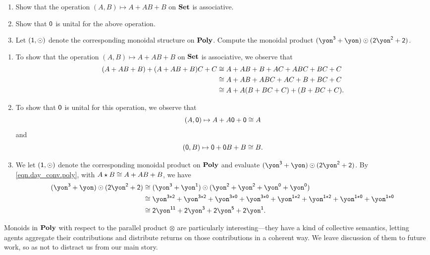 \documentclass[Book-Poly]{subfiles}
\begin{document}
\begin{exercise}
\begin{enumerate}
	\item Show that the operation $(A, B)\mapsto A+AB+B$ on $\mathbf{Set}$ is associative.
	\item Show that $\textsf{0}$ is unital for the above operation.
	\item Let $(\textsf{1},\odot)$ denote the corresponding monoidal structure on $\mathbf{Poly}$. Compute the monoidal product $(\yon^\3+\yon)\odot(\2\yon^\2+\2)$.
\qedhere
\end{enumerate}
\begin{solution}
\begin{enumerate}
    \item To show that the operation $(A, B)\mapsto A+AB+B$ on $\mathbf{Set}$ is associative, we observe that
    \begin{align*}
        (A + AB + B) + (A + AB + B)C + C &\cong A + AB + B + AC + ABC + BC + C \\
        &\cong A + AB + ABC + AC + B + BC + C \\
        &\cong A + A(B + BC + C) + (B + BC + C).
    \end{align*}
    \item To show that $\textsf{0}$ is unital for this operation, we observe that
    \[
        (A, \textsf{0}) \mapsto A + A\textsf{0} + \textsf{0} \cong A
    \]
    and
    \[
        (\textsf{0}, B) \mapsto \textsf{0} + \textsf{0}B + B \cong B.
    \]
    \item We let $(\textsf{1},\odot)$ denote the corresponding monoidal product on $\mathbf{Poly}$ and evaluate $(\yon^\3+\yon)\odot(\2\yon^\2+\2)$.
    By \eqref{eqn.day_conv.poly}, with $A \star B \cong A + AB + B$, we have
    \begin{align*}
        (\yon^\3+\yon)\odot(\2\yon^\2+\2) &\iso (\yon^\3+\yon^\1)\odot(\yon^\2+\yon^\2+\yon^\0+\yon^\0) \\
        &\iso \yon^{\3\star\2} + \yon^{\3\star\2} + \yon^{\3\star\0} + \yon^{\3\star\0} + \yon^{\1\star\2} + \yon^{\1\star\2} + \yon^{\1\star\0} + \yon^{\1\star\0} \\
        &\iso \2\yon^{\1\1} + \2\yon^\3 + \2\yon^\5 + \2\yon^\1.
    \end{align*}
\end{enumerate}
\end{solution}
\end{exercise}

\begin{remark}
Monoids in $\mathbf{Poly}$ with respect to the parallel product $\otimes$ are particularly interesting---they have a kind of collective semantics, letting agents aggregate their contributions and distribute returns on those contributions in a coherent way.
We leave discussion of them to future work, so as not to distract us from our main story.
\end{remark}
\end{document}
